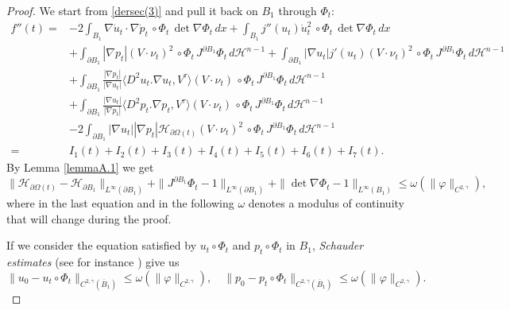 \documentclass[oneside,a4paper,11pt,notitlepage]{article}
\newcommand{\abs}[1]{{\left|#1\right|}}
\theoremstyle{definition}
\theoremstyle{plain}
\theoremstyle{definition}
\begin{document}
\begin{proof}
    We start from \eqref{dersec(3)} and pull it back on $B_1$ through $\Phi_t$:
    \begin{equation*}
        \begin{split}
            f''(t)=&-2\int_{B_1}\nabla\dot{u}_t\cdot\nabla\dot{p}_t\,\circ\Phi_t\,\det{\nabla\Phi_t}\,dx+\int_{B_1}j''(u_t)\dot{u}_t^2\,\circ\Phi_t\,\det{\nabla\Phi_t}\,dx\\
            &+\int_{\partial B_1}\abs{\nabla p_t}(V\cdot\nu_t)^2\,\circ\Phi_t\,J^{\partial B_1}\Phi_t\,d\mathcal{H}^{n-1}+\int_{\partial B_1}\abs{\nabla u_t}j'(u_t)(V\cdot\nu_t)^2\,\circ\Phi_t\,J^{\partial B_1}\Phi_t\,d\mathcal{H}^{n-1}\\
            &+\int_{\partial B_1}\frac{\abs{\nabla p_t}}{\abs{\nabla u_t}}\langle D^2u_t.\nabla u_t,V^\tau\rangle(V\cdot\nu_t)\,\circ\Phi_t\,J^{\partial B_1}\Phi_t\,d\mathcal{H}^{n-1}\\
            &+\int_{\partial B_1}\frac{\abs{\nabla u_t}}{\abs{\nabla p_t}}\langle D^2p_t.\nabla p_t,V^\tau\rangle(V\cdot\nu_t)\,\circ\Phi_t\,J^{\partial B_1}\Phi_t\,d\mathcal{H}^{n-1}\\
            &-2\int_{\partial B_1}\abs{\nabla u_t}\abs{\nabla p_t}\mathscr{H}_{\partial\Omega(t)}(V\cdot\nu_t)^2\,\circ\Phi_t\,J^{\partial B_1}\Phi_t\,d\mathcal{H}^{n-1}\\
            =&I_1(t)+I_2(t)+I_3(t)+I_4(t)+I_5(t)+I_6(t)+I_7(t).
        \end{split}
    \end{equation*}
    By Lemma \ref{lemmaA.1} we get
    \begin{equation}\label{StimeL^inf}
        \|\mathscr{H}_{\partial\Omega(t)}-\mathscr{H}_{\partial B_1}\|_{L^\infty(\partial B_1)}+\|J^{\partial B_1}\Phi_t-1\|_{L^\infty(\partial B_1)}+\|\det{\nabla \Phi_t}-1\|_{L^\infty(B_1)}\leq\omega(\|\varphi\|_{C^{2,\gamma}}),
    \end{equation}
    where in the last equation and in the following $\omega$ denotes a modulus of continuity that will change during the proof.
    
    If we consider the equation satisfied by $u_t\circ\Phi_t$ and $p_t\circ\Phi_t$ in $B_1$, \emph{Schauder estimates} (see for instance \cite[Section 6.3]{GT}) give us
    \begin{equation}\label{Schauder}
        \|u_0-u_t\circ\Phi_t\|_{C^{2,\gamma}(\overline{B}_1)}\leq\omega(\|\varphi\|_{C^{2,\gamma}}),\quad \|p_0-p_t\circ\Phi_t\|_{C^{2,\gamma}(\overline{B}_1)}\leq\omega(\|\varphi\|_{C^{2,\gamma}}).
    \end{equation}


\end{proof}
\end{document}
